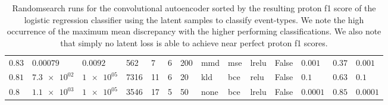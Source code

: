 \begin{landscape}
\begin{table}
\begin{tabular}{llllllllllllll}
$\num{ 0.83 }$ & $\num{ 0.00079 }$ &  $\num{ 0.0092 }$ &          562 &              7 &        6 &              200 &         mmd &                 mse &               lrelu &     False &  $\num{ 0.001 }$ & $\num{ 0.37 }$ &  $\num{ 0.001 }$ \\
$\num{ 0.81 }$ & $\num{ 7.3e+02 }$ &   $\num{ 1e+05 }$ &         7316 &             11 &        6 &               20 &         kld &                 bce &                relu &     False &    $\num{ 0.1 }$ & $\num{ 0.63 }$ &    $\num{ 0.1 }$ \\
 $\num{ 0.8 }$ & $\num{ 1.1e+03 }$ &   $\num{ 1e+05 }$ &         3546 &             17 &        5 &               50 &        none &                 bce &               lrelu &     False & $\num{ 0.0001 }$ & $\num{ 0.85 }$ & $\num{ 0.0001 }$ \\
\bottomrule
\end{tabular}

\caption{Randomsearch runs for the convolutional autoencoder sorted by the resulting proton f1 score of the logistic regression classifier using the latent samples to classify event-types. We note the high occurrence of the maximum mean discrepancy with the higher performing classifications. We also note that simply no latent loss is able to achieve near perfect proton f1 scores.}\label{tab:convae_randomsearch}
\end{table}
\end{landscape}

\clearpage
{}
